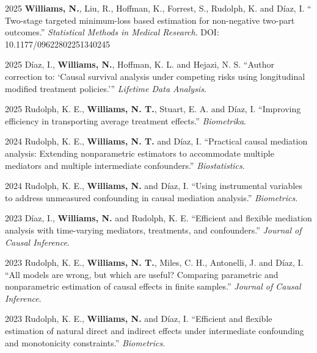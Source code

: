 \documentclass[12pt,letterpaper]{report}
\begin{document}
    \begin{tablist}
   
    \item[2025] \tab \textbf{Williams, N.}, Liu, R., Hoffman, K., Forrest, S., Rudolph, K. and Díaz, I. \enquote{
Two-stage targeted minimum-loss based estimation for non-negative two-part outcomes.} \textit{
Statistical Methods in Medical Research}. DOI: 10.1177/09622802251340245
    
    \item[2025] \tab Díaz, I., \textbf{Williams, N.}, Hoffman, K. L. and Hejazi, N. S. \enquote{Author correction to: `Causal survival analysis under competing risks using longitudinal modified treatment policies.'} \textit{Lifetime Data Analysis}.
    
    \item[2025] \tab Rudolph, K. E., \textbf{Williams, N. T.}, Stuart, E. A. and Díaz, I. \enquote{Improving efficiency in transporting average treatment effects.} \textit{Biometrika}.
    
    \item[2024] \tab Rudolph, K. E., \textbf{Williams, N. T.} and Díaz, I. \enquote{Practical causal mediation analysis: Extending nonparametric estimators to accommodate multiple mediators and multiple intermediate confounders.} \textit{Biostatistics}.
    
    \item[2024] \tab Rudolph, K. E., \textbf{Williams, N.} and Díaz, I. \enquote{Using instrumental variables to address unmeasured confounding in causal mediation analysis.} \textit{Biometrics}.
    
    \item[2023] \tab Díaz, I., \textbf{Williams, N.} and Rudolph, K. E. \enquote{Efficient and flexible mediation analysis with time-varying mediators, treatments, and confounders.} \textit{Journal of Causal Inference}.
    
    \item[2023] \tab Rudolph, K. E., \textbf{Williams, N. T.}, Miles, C. H., Antonelli, J. and Díaz, I. \enquote{All models are wrong, but which are useful? Comparing parametric and nonparametric estimation of causal effects in finite samples.} \textit{Journal of Causal Inference}.
    
    \item[2023] \tab Rudolph, K. E., \textbf{Williams, N.} and Díaz, I. \enquote{Efficient and flexible estimation of natural direct and indirect effects under intermediate confounding and monotonicity constraints.} \textit{Biometrics}.
    

\end{tablist}
\end{document}
